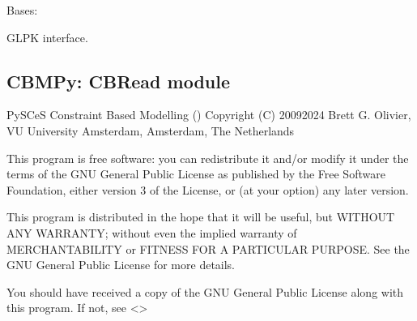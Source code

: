 \documentclass[letterpaper,12pt,english]{sphinxmanual}
\begin{document}

\begin{fulllineitems}
\label{\detokenize{api/core:cbmpy.CBSolve.LPglpk}}
\pysigstartsignatures
\pysiglinewithargsret
{}
{}
{}
\pysigstopsignatures
\sphinxAtStartPar
Bases: {\hyperref[\detokenize{api/core:cbmpy.CBSolve.LPbase}]{}}

\sphinxAtStartPar
GLPK interface.

\begin{fulllineitems}
\label{\detokenize{api/core:cbmpy.CBSolve.LPglpk.__init__}}
\pysigstartsignatures
\pysiglinewithargsret
{}
{}
{}
\pysigstopsignatures
\end{fulllineitems}


\end{fulllineitems}



\subsection{CBMPy: CBRead module}
\label{\detokenize{api/core:cbmpy-cbread-module}}
\sphinxAtStartPar
PySCeS Constraint Based Modelling ()
Copyright (C) 2009\sphinxhyphen{}2024 Brett G. Olivier, VU University Amsterdam, Amsterdam, The Netherlands

\sphinxAtStartPar
This program is free software: you can redistribute it and/or modify
it under the terms of the GNU General Public License as published by
the Free Software Foundation, either version 3 of the License, or
(at your option) any later version.

\sphinxAtStartPar
This program is distributed in the hope that it will be useful,
but WITHOUT ANY WARRANTY; without even the implied warranty of
MERCHANTABILITY or FITNESS FOR A PARTICULAR PURPOSE.  See the
GNU General Public License for more details.

\sphinxAtStartPar
You should have received a copy of the GNU General Public License
along with this program.  If not, see \textless{}\textgreater{}
\end{document}
